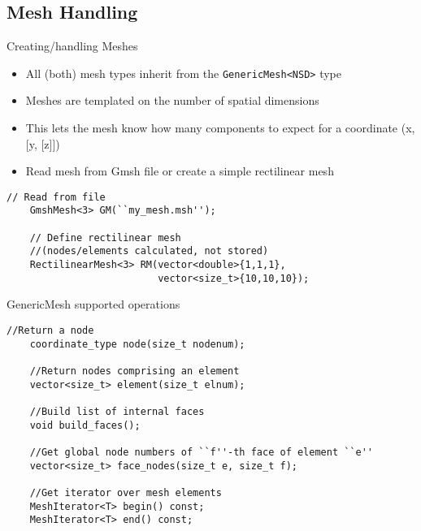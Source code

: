 \subsection{Mesh Handling}
\begin{frame}[fragile]{Creating/handling Meshes}
  \begin{itemize}
  \item
    All (both) mesh types inherit from the \texttt{GenericMesh<NSD>} type
  \item
    Meshes are templated on the number of spatial dimensions
  \item
    This lets the mesh know how many components to expect for a coordinate (x, [y, [z]])
  \item
    Read mesh from Gmsh file or create a simple rectilinear mesh
  \end{itemize}

  \begin{lstlisting}[basicstyle=\small\ttfamily]
    // Read from file
    GmshMesh<3> GM(``my_mesh.msh''); 

    // Define rectilinear mesh 
    //(nodes/elements calculated, not stored)
    RectilinearMesh<3> RM(vector<double>{1,1,1}, 
                          vector<size_t>{10,10,10});
  \end{lstlisting}

\end{frame}

\begin{frame}[fragile]{GenericMesh supported operations}
  \begin{lstlisting}[]
    //Return a node
    coordinate_type node(size_t nodenum);
    
    //Return nodes comprising an element
    vector<size_t> element(size_t elnum);

    //Build list of internal faces
    void build_faces();

    //Get global node numbers of ``f''-th face of element ``e''
    vector<size_t> face_nodes(size_t e, size_t f);

    //Get iterator over mesh elements 
    MeshIterator<T> begin() const;
    MeshIterator<T> end() const;
  \end{lstlisting}
\end{frame}


